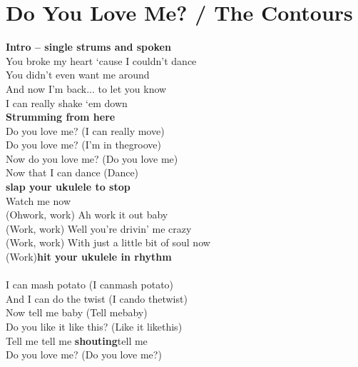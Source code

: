 \section{Do You Love Me? / The Contours}\label{sec:doyouloveme}

\Gmajor
\BmajorSeven
\Eminor
\AmajorSeven
\Cmajor
\DmajorEasy
\Aminor

\textbf{Intro – single strums and spoken}\\
 You broke my heart ‘cause I couldn’t dance\\
You didn’t even want me around\\
And now I’m back... to let you know\\
I can really shake ‘em down\\
\textbf{Strumming from here}\\
Do you love me? (I can really move)\\
Do you love me? (I’m in thegroove)\\
Now do you love me? (Do you love me)\\
Now that I can dance (Dance)\\
\textbf{slap your ukulele to stop}\\
Watch me now\\
(Ohwork, work) Ah work it out baby\\
(Work, work) Well you’re drivin’ me crazy\\
(Work, work) With just a little bit of soul now\\
(Work)\textbf{hit your ukulele in rhythm}\\
\\
I can mash potato (I canmash potato)\\
And I can do the twist (I cando thetwist)\\
Now tell me baby (Tell mebaby)\\
Do you like it like this? (Like it likethis)\\
Tell me tell me \textbf{shouting}tell me\\
Do you love me? (Do you love me?)\\
